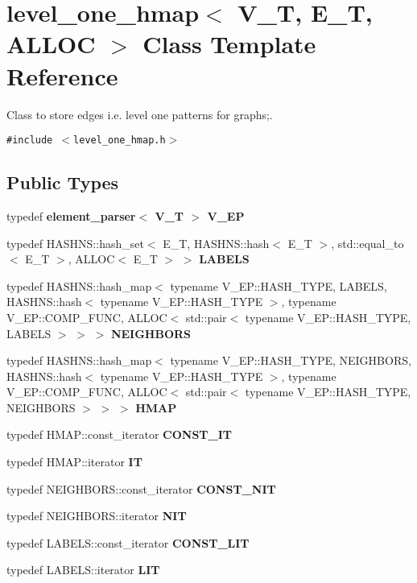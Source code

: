 \section{level\_\-one\_\-hmap$<$ V\_\-T, E\_\-T, ALLOC $>$ Class Template Reference}
\label{classlevel__one__hmap}
Class to store edges i.e. level one patterns for graphs;.  


{\tt \#include $<$level\_\-one\_\-hmap.h$>$}

\subsection*{Public Types}
\begin{CompactItemize}
\item 
typedef \bf{element\_\-parser}$<$ V\_\-T $>$ \textbf{V\_\-EP}\label{classlevel__one__hmap_2486779a60e73d3287e09c2ce18db9cf}

\item 
typedef HASHNS::hash\_\-set$<$ E\_\-T, HASHNS::hash$<$ E\_\-T $>$, std::equal\_\-to$<$ E\_\-T $>$, ALLOC$<$ E\_\-T $>$ $>$ \textbf{LABELS}\label{classlevel__one__hmap_301b7945ad1371193f119d1a4c31763d}

\item 
typedef HASHNS::hash\_\-map$<$ typename V\_\-EP::HASH\_\-TYPE, LABELS, HASHNS::hash$<$ typename V\_\-EP::HASH\_\-TYPE $>$, typename V\_\-EP::COMP\_\-FUNC, ALLOC$<$ std::pair$<$ typename V\_\-EP::HASH\_\-TYPE, LABELS $>$ $>$ $>$ \textbf{NEIGHBORS}\label{classlevel__one__hmap_53615a39cb137a9840f1ac66c6090f45}

\item 
typedef HASHNS::hash\_\-map$<$ typename V\_\-EP::HASH\_\-TYPE, NEIGHBORS, HASHNS::hash$<$ typename V\_\-EP::HASH\_\-TYPE $>$, typename V\_\-EP::COMP\_\-FUNC, ALLOC$<$ std::pair$<$ typename V\_\-EP::HASH\_\-TYPE, NEIGHBORS $>$ $>$ $>$ \textbf{HMAP}\label{classlevel__one__hmap_21522a91089f0c0e8d6b1b29dfdc0257}

\item 
typedef HMAP::const\_\-iterator \textbf{CONST\_\-IT}\label{classlevel__one__hmap_a207752749c72dc839998fa0a70310b9}

\item 
typedef HMAP::iterator \textbf{IT}\label{classlevel__one__hmap_cc0609da994772b4daef8eef1e904ff3}

\item 
typedef NEIGHBORS::const\_\-iterator \textbf{CONST\_\-NIT}\label{classlevel__one__hmap_c80ca28c34a63a66c88a321be41e4719}

\item 
typedef NEIGHBORS::iterator \textbf{NIT}\label{classlevel__one__hmap_d86872fad6788611731fdd976d8a9f8b}

\item 
typedef LABELS::const\_\-iterator \textbf{CONST\_\-LIT}\label{classlevel__one__hmap_0d1b7103445170b87a68525313104fff}

\item 
typedef LABELS::iterator \textbf{LIT}\label{classlevel__one__hmap_f574b4df476a3fe80cf4972e55e6cd1c}

\end{CompactItemize}
